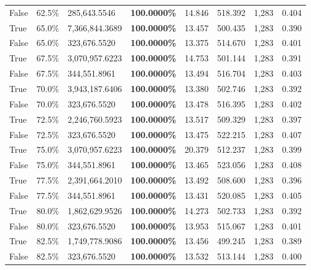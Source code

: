 \begin{table}[H]
\begin{tabular}{lllrllll}
\cline{1-8}
False & 62.5\% & \color{red} 285,643.5546 & \bfseries \color{red} 100.0000\% & 14.846 & 518.392 & 1,283 & 0.404 \\
\cline{1-8}
True & 65.0\% & 7,366,844.3689 & \bfseries \color{red} 100.0000\% & 13.457 & 500.435 & 1,283 & 0.390 \\
\cline{1-8}
False & 65.0\% & 323,676.5520 & \bfseries \color{red} 100.0000\% & 13.375 & 514.670 & 1,283 & 0.401 \\
\cline{1-8}
True & 67.5\% & 3,070,957.6223 & \bfseries \color{red} 100.0000\% & 14.753 & 501.144 & 1,283 & 0.391 \\
\cline{1-8}
False & 67.5\% & 344,551.8961 & \bfseries \color{red} 100.0000\% & 13.494 & 516.704 & 1,283 & 0.403 \\
\cline{1-8}
True & 70.0\% & 3,943,187.6406 & \bfseries \color{red} 100.0000\% & 13.380 & 502.746 & 1,283 & 0.392 \\
\cline{1-8}
False & 70.0\% & 323,676.5520 & \bfseries \color{red} 100.0000\% & 13.478 & 516.395 & 1,283 & 0.402 \\
\cline{1-8}
True & 72.5\% & 2,246,760.5923 & \bfseries \color{red} 100.0000\% & 13.517 & 509.329 & 1,283 & 0.397 \\
\cline{1-8}
False & 72.5\% & 323,676.5520 & \bfseries \color{red} 100.0000\% & 13.475 & 522.215 & 1,283 & 0.407 \\
\cline{1-8}
True & 75.0\% & 3,070,957.6223 & \bfseries \color{red} 100.0000\% & 20.379 & 512.237 & 1,283 & 0.399 \\
\cline{1-8}
False & 75.0\% & 344,551.8961 & \bfseries \color{red} 100.0000\% & 13.465 & 523.056 & 1,283 & 0.408 \\
\cline{1-8}
True & 77.5\% & 2,391,664.2010 & \bfseries \color{red} 100.0000\% & 13.492 & 508.600 & 1,283 & 0.396 \\
\cline{1-8}
False & 77.5\% & 344,551.8961 & \bfseries \color{red} 100.0000\% & 13.431 & 520.085 & 1,283 & 0.405 \\
\cline{1-8}
True & 80.0\% & 1,862,629.9526 & \bfseries \color{red} 100.0000\% & 14.273 & 502.733 & 1,283 & 0.392 \\
\cline{1-8}
False & 80.0\% & 323,676.5520 & \bfseries \color{red} 100.0000\% & 13.953 & 515.067 & 1,283 & 0.401 \\
\cline{1-8}
True & 82.5\% & 1,749,778.9086 & \bfseries \color{red} 100.0000\% & 13.456 & 499.245 & 1,283 & 0.389 \\
\cline{1-8}
False & 82.5\% & 323,676.5520 & \bfseries \color{red} 100.0000\% & 13.532 & 513.144 & 1,283 & 0.400 \\

\end{tabular}
\end{table}
